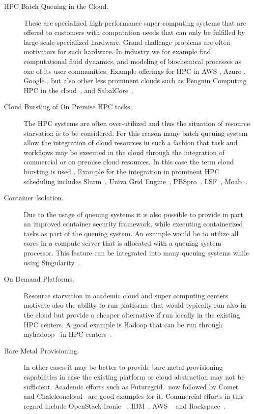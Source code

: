 \documentclass[final,5p,times,twocolumn]{elsarticle}
\begin{document}
\begin{description}

\item[HPC Batch Queuing in the Cloud.] These are specialized
  high-performance super-computing systems that are offered to
  customers with computation needs that can only be fulfilled by large
  scale specialized hardware. Grand challenge problems are often
  motivators for such hardware. In industry we for example find
  computational fluid dynamics, and modeling of biochemical processes
  as one of its user communities. Example offerings for HPC in AWS
  \cite{www-aws-hpc}, Azure \cite{www-azure-hpc}, Google \cite{www-google-hpc},
  but also other less prominent clouds such as Penguin Computing HPC
  in the cloud~\cite{PODHPCCloud2019}, and
  SabalCore~\cite{Sabalcore2019}.
  
\item[Cloud Bursting of On Premise HPC tasks.] The HPC systems are
  often over-utilized and thus the situation of resource starvation is
  to be considered. For this reason many batch queuing system allow
  the integration of cloud resources in such a fashion that task and
  workflows may be executed in the cloud through the integration of
  commercial or on premise cloud resources. In this case the term
  cloud bursting is used
  \cite{CloudBursting2019,BurstingHPC2019}. Example for the
  integration in prominent HPC scheduling includes Slurm~\cite{www-slurm},
  Univa Grid Engine~\cite{www-univa}, PBSpro~\cite{www-pbs-manual}, LSF~\cite{www-lsf-job-dep},
  Moab~\cite{www-moab-job-dep}.

\item[Container Isolation.] Due to the usage of queuing systems it is
  also possible to provide in part an improved container security
  framework, while executing containerized tasks as part of the
  queuing system. An example would be to utilize all cores in a
  compute server that is allocated with a queuing system
  processor. This feature can be integrated into many queuing systems
  while using Singularity~\cite{www-singularity}.

\item[On Demand Platforms.] Resource starvation in academic cloud and
  super computing centers motivate also the ability to run platforms
  that would typically run also in the cloud but provide a cheaper
  alternative if run locally in the existing HPC centers. A good
  example is Hadoop that can be run through
  myhadoop~\cite{krishnan2011myhadoop} in HPC centers~\cite{SDSC2019}.

\item[Bare Metal Provisioning.] In other cases it may be better to
  provide bare metal provisioning capabilities in case the
  existing platform or cloud abstraction may not be sufficient.
  Academic efforts such as Futuregrid~\cite{fox2013futuregrid} now
  followed by Comet~\cite{las-comet} and Chaleleoncloud~\cite{Chameleoncloud2019} 
  are good examples for it. Commercial
  efforts in this regard include OpenStack Ironic
 ~\cite{OpenstackIronic2019}, IBM~\cite{IBMBareMetal2019}, AWS
 ~\cite{AWS2019} and Rackspace~\cite{Rackspace2019}.

\end{description}
\end{document}
